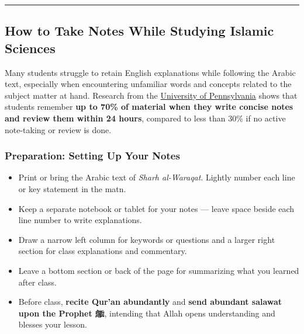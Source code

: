 \documentclass[
  a4paper,
  DIV=11,
  numbers=noendperiod]{scrartcl}
\providecommand{\tightlist}{%
  \setlength{\itemsep}{0pt}\setlength{\parskip}{0pt}}
\begin{document}
\begin{center}\rule{0.5\linewidth}{0.5pt}\end{center}

\subsection{How to Take Notes While Studying Islamic
Sciences}\label{note-taking}

Many students struggle to retain English explanations while following
the Arabic text, especially when encountering unfamiliar words and
concepts related to the subject matter at hand. Research from the
\href{https://weingartencenter.universitylife.upenn.edu/take-better-notes-the-relationship-between-time-and-memory/}{University
of Pennsylvania} shows that students remember \textbf{up to 70\% of
material when they write concise notes and review them within 24 hours},
compared to less than 30\% if no active note-taking or review is done.

\subsubsection{Preparation: Setting Up Your
Notes}\label{preparation-setting-up-your-notes}

\begin{tcolorbox}[enhanced jigsaw, left=2mm, colframe=quarto-callout-note-color-frame, bottomrule=.15mm, titlerule=0mm, toprule=.15mm, opacityback=0, breakable, toptitle=1mm, colbacktitle=quarto-callout-note-color!10!white, rightrule=.15mm, title=\textcolor{quarto-callout-note-color}{\faInfo}\hspace{0.5em}{Before the Lesson}, arc=.35mm, bottomtitle=1mm, leftrule=.75mm, opacitybacktitle=0.6, colback=white, coltitle=black]

\begin{itemize}
\tightlist
\item
  Print or bring the Arabic text of \emph{Sharh al-Waraqat}. Lightly
  number each line or key statement in the matn.
\item
  Keep a separate notebook or tablet for your notes --- leave space
  beside each line number to write explanations.
\item
  Draw a narrow left column for keywords or questions and a larger right
  section for class explanations and commentary.
\item
  Leave a bottom section or back of the page for summarizing what you
  learned after class.
\item
  Before class, \textbf{recite Qur'an abundantly} and \textbf{send
  abundant salawat upon the Prophet ﷺ}, intending that Allah opens
  understanding and blesses your lesson.
\end{itemize}

\end{tcolorbox}
\end{document}
